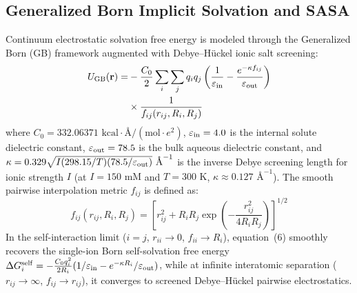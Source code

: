 \documentclass[journal=jpcbfk,manuscript=article]{achemso}
\begin{document}
\subsection{Generalized Born Implicit Solvation and SASA}
Continuum electrostatic solvation free energy is modeled through the Generalized Born (GB) framework augmented with Debye--H\"uckel ionic salt screening:\cite{still1990semianalytical,onufriev2004exploring}
\begin{align}
U_{\rm GB}(\mathbf{r}) = &- \frac{C_0}{2} \sum_{i} \sum_{j} q_i q_j \left( \frac{1}{\varepsilon_{\rm in}} - \frac{e^{-\kappa f_{ij}}}{\varepsilon_{\rm out}} \right) \nonumber \\
&\times \frac{1}{f_{ij}(r_{ij}, R_i, R_j)}
\end{align}
where $C_0 = 332.06371\text{ kcal}\cdot\text{\AA}/(\text{mol}\cdot e^2)$, $\varepsilon_{\rm in} = 4.0$ is the internal solute dielectric constant, $\varepsilon_{\rm out} = 78.5$ is the bulk aqueous dielectric constant, and $\kappa = 0.329 \sqrt{I (298.15/T)(78.5/\varepsilon_{\rm out})}\text{ \AA}^{-1}$ is the inverse Debye screening length for ionic strength $I$ (at $I = 150\text{ mM}$ and $T = 300\text{ K}$, $\kappa \approx 0.127\text{ \AA}^{-1}$). The smooth pairwise interpolation metric $f_{ij}$ is defined as:
\begin{equation}
f_{ij}(r_{ij}, R_i, R_j) = \left[ r_{ij}^2 + R_i R_j \exp\left( -\frac{r_{ij}^2}{4 R_i R_j} \right) \right]^{1/2}
\end{equation}
In the self-interaction limit ($i = j$, $r_{ii} \to 0$, $f_{ii} \to R_i$), equation~(6) smoothly recovers the single-ion Born self-solvation free energy $\Delta G_i^{\rm self} = -\frac{C_0 q_i^2}{2 R_i} (1/\varepsilon_{\rm in} - e^{-\kappa R_i}/\varepsilon_{\rm out})$, while at infinite interatomic separation ($r_{ij} \to \infty$, $f_{ij} \to r_{ij}$), it converges to screened Debye--H\"uckel pairwise electrostatics.
\end{document}
